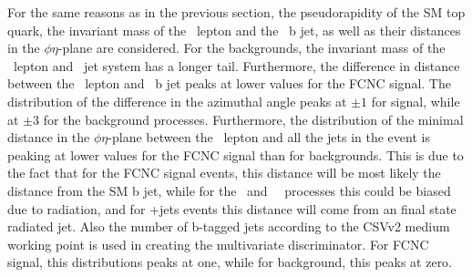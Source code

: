    For the same reasons as in the previous section, the pseudorapidity of the SM top quark,  the invariant mass of the \PW\ lepton and the \SM\ b jet, as well as their distances in the $\phi\eta$-plane are considered. For the backgrounds, the invariant mass of the \PW\ lepton and \SM\ jet system has a longer tail. Furthermore, the difference in distance  between the \PW\ lepton and \SM\ b jet peaks at lower values for the FCNC signal. The distribution of the difference in the azimuthal angle peaks at $\pm1$ for signal, while at $\pm 3$ for the background processes. Furthermore, the distribution of the minimal distance in the $\phi\eta$-plane between the \PW\ lepton and all the jets in the event is peaking at lower values for the FCNC signal than for backgrounds. This is due to the fact that for the FCNC signal events, this distance will be most likely the distance from the SM b  jet, while for the \ttZ\ and \SM\ \tZq\ processes this could be biased due to radiation, and for \WZ+jets events this distance will come from an final state radiated jet.  Also the number of b-tagged jets according to the CSVv2 medium working point is used in creating the multivariate discriminator. For FCNC signal, this distributions peaks at one, while for background, this peaks at zero.
   
